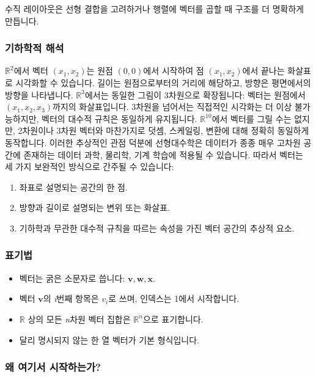 \documentclass[
  12pt,
  a4paper,
]{article}
\begin{document}
수직 레이아웃은 선형 결합을 고려하거나 행렬에 벡터를 곱할 때 구조를 더 명확하게 만듭니다.

\subsubsection{기하학적 해석}\label{geometric-interpretation}

\(\mathbb{R}^2\)에서 벡터 \((x_1, x_2)\)는 원점 \((0,0)\)에서 시작하여 점 \((x_1, x_2)\)에서 끝나는 화살표로 시각화할 수 있습니다. 길이는 원점으로부터의 거리에 해당하고, 방향은 평면에서의 방향을 나타냅니다. \(\mathbb{R}^3\)에서는 동일한 그림이 3차원으로 확장됩니다: 벡터는 원점에서 \((x_1, x_2, x_3)\)까지의 화살표입니다. 3차원을 넘어서는 직접적인 시각화는 더 이상 불가능하지만, 벡터의 대수적 규칙은 동일하게 유지됩니다. \(\mathbb{R}^{10}\)에서 벡터를 그릴 수는 없지만, 2차원이나 3차원 벡터와 마찬가지로 덧셈, 스케일링, 변환에 대해 정확히 동일하게 동작합니다. 이러한 추상적인 관점 덕분에 선형대수학은 데이터가 종종 매우 고차원 공간에 존재하는 데이터 과학, 물리학, 기계 학습에 적용될 수 있습니다. 따라서 벡터는 세 가지 보완적인 방식으로 간주될 수 있습니다:

\begin{enumerate}
\def\labelenumi{\arabic{enumi}.}
\item
  좌표로 설명되는 공간의 한 점.
\item
  방향과 길이로 설명되는 변위 또는 화살표.
\item
  기하학과 무관한 대수적 규칙을 따르는 속성을 가진 벡터 공간의 추상적 요소.
\end{enumerate}

\subsubsection{표기법}\label{notation}

\begin{itemize}
\item
  벡터는 굵은 소문자로 씁니다: \(\mathbf{v}, \mathbf{w}, \mathbf{x}\).
\item
  벡터 \(\mathbf{v}\)의 \emph{i}번째 항목은 \(v_i\)로 쓰며, 인덱스는 1에서 시작합니다.
\item
  \(\mathbb{R}\) 상의 모든 \emph{n}차원 벡터 집합은 \(\mathbb{R}^n\)으로 표기합니다.
\item
  달리 명시되지 않는 한 열 벡터가 기본 형식입니다.
\end{itemize}

\subsubsection{왜 여기서 시작하는가?}\label{why-begin-here}
\end{document}
